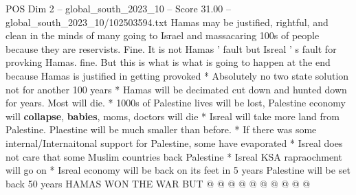 \begin{textsample}{POS Dim 2 – global\_south\_2023\_10 – Score 31.00 – global\_south\_2023\_10/102503594.txt}
Hamas may be justified, rightful, and clean in the minds of many going to Israel and massacaring 100s of people because they are reservists.
Fine.
It is not Hamas ' fault but Isreal ' s fault for provking Hamas. fine.
But this is what is what is going to happen at the end because Hamas is justified in getting provoked * Absolutely no two state solution not for another 100 years * Hamas will be decimated cut down and hunted down for years.
Most will die. * 1000s of Palestine lives will be lost, Palestine economy will \textbf{collapse}, \textbf{babies}, moms, doctors will die * Isreal will take more land from Palestine.
Plaestine will be much smaller than before. * If there was some internal/Internaitonal support for Palestine, some have evaporated * Isreal does not care that some Muslim countries back Palestine * Isreal KSA rapraochment will go on * Isreal economy will be back on its feet in 5 years Palestine will be set back 50 years HAMAS WON THE WAR BUT @ @ @ @ @ @ @ @ @ @

\end{textsample}
